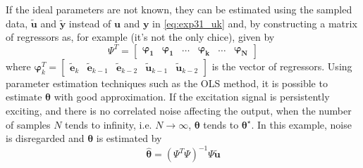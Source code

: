 \begin{exmp}
   If the ideal parameters are not known, they can be estimated using the sampled data, $\tilde{\bm{u}}$ and $\tilde{\bm{y}}$ instead of $\bm{u}$ and $\bm{y}$ in \eqref{eq:exp31_uk} and, by constructing a matrix of regressors as, for example (it's not the only chice), given by
   \begin{equation*}
      \Psi^T=\begin{bmatrix} \bm{\varphi_1} & \bm{\varphi_1} & \dots & \bm{\varphi_k}  & \dots & \bm{\varphi_N} \end{bmatrix}
   \end{equation*}
   where $\bm{\varphi}^T_k =\begin{bmatrix} \tilde{\bm{e}}_{k} & \tilde{\bm{e}}_{k-1} & \tilde{\bm{e}}_{k-2} & \tilde{\bm{u}}_{k-1} & \tilde{\bm{u}}_{k-2} \end{bmatrix}$ is the vector of regressors.
   Using parameter estimation techniques such as the OLS method, it is possible to estimate $\bm{\theta}$ with good approximation.
   If the excitation signal is persistently exciting, and there is no correlated noise affecting the output, when the number of samples $N$ tends to infinity, i.e. $N \to \infty$, $\bm{\theta}$ tends to $\bm{\theta}^\star$.
   In this example, noise is disregarded and $\bm{\theta}$ is estimated by
   \begin{equation*}
      \hat{\bm{\theta}} = (\Psi^T\Psi)^{-1}\Psi\tilde{\bm{u}}
   \label{eq:}
   \end{equation*}
   

\end{exmp}
